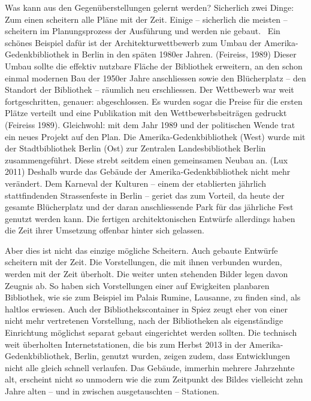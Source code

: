 \documentclass[a4paper,
fontsize=11pt,
oneside,
numbers=noperiodatend,
parskip=half-,
bibliography=totoc,
final
]{scrartcl}
\begin{document}
Was kann aus den Gegenüberstellungen gelernt werden? Sicherlich zwei
Dinge: Zum einen scheitern alle Pläne mit der Zeit. Einige -- sicherlich
die meisten -- scheitern im Planungsprozess der Ausführung und werden
nie gebaut.~ Ein schönes Beispiel dafür ist der Architekturwettbewerb
zum Umbau der Amerika-Gedenkbibliothek in Berlin in den späten 1980er
Jahren. (Feireiss, 1989) Dieser Umbau sollte die effektiv nutzbare
Fläche der Bibliothek erweitern, an den schon einmal modernen Bau der
1950er Jahre anschliessen sowie den Blücherplatz -- den Standort der
Bibliothek -- räumlich neu erschliessen. Der Wettbewerb war weit
fortgeschritten, genauer: abgeschlossen. Es wurden sogar die Preise für
die ersten Plätze verteilt und eine Publikation mit den
Wettbewerbsbeiträgen gedruckt (Feireiss 1989). Gleichwohl: mit dem Jahr
1989 und der politischen Wende trat ein neues Projekt auf den Plan. Die
Amerika-Gedenkbibliothek (West) wurde mit der Stadtbibliothek Berlin
(Ost) zur Zentralen Landesbibliothek Berlin zusammengeführt. Diese
strebt seitdem einen gemeinsamen Neubau an. (Lux 2011) Deshalb wurde das
Gebäude der Amerika-Gedenkbibliothek nicht mehr verändert. Dem Karneval
der Kulturen -- einem der etablierten jährlich stattfindenden
Strassenfeste in Berlin -- geriet das zum Vorteil, da heute der gesamte
Blücherplatz und der daran anschliessende Park für das jährliche Fest
genutzt werden kann. Die fertigen architektonischen Entwürfe allerdings
haben die Zeit ihrer Umsetzung offenbar hinter sich gelassen.

Aber dies ist nicht das einzige mögliche Scheitern. Auch gebaute
Entwürfe scheitern mit der Zeit. Die Vorstellungen, die mit ihnen
verbunden wurden, werden mit der Zeit überholt. Die weiter unten
stehenden Bilder legen davon Zeugnis ab. So haben sich Vorstellungen
einer auf Ewigkeiten planbaren Bibliothek, wie sie zum Beispiel im
Palais Rumine, Lausanne, zu finden sind, als haltlos erwiesen. Auch der
Bibliothekscontainer in Spiez zeugt eher von einer nicht mehr
vertretenen Vorstellung, nach der Bibliotheken als eigenständige
Einrichtung möglichst separat gebaut eingerichtet werden sollten. Die
technisch weit überholten Internetstationen, die bis zum Herbst 2013 in
der Amerika-Gedenkbibliothek, Berlin, genutzt wurden, zeigen zudem, dass
Entwicklungen nicht alle gleich schnell verlaufen. Das Gebäude, immerhin
mehrere Jahrzehnte alt, erscheint nicht so unmodern wie die zum
Zeitpunkt des Bildes vielleicht zehn Jahre alten -- und in zwischen
ausgetauschten -- Stationen.
\end{document}
